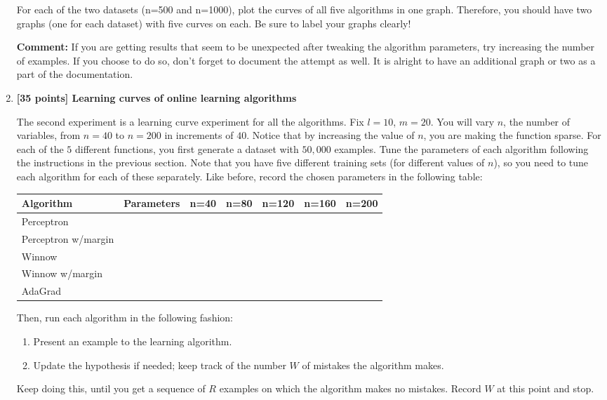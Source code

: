 \begin{enumerate}
For each of the two datasets (n=500 and n=1000), plot the curves of all
five algorithms in one graph. Therefore, you should have two
graphs (one for each dataset) with five curves on each. Be sure to
label your graphs clearly!

{\bf Comment: }If you are getting results that seem to be unexpected
after tweaking the algorithm parameters, try increasing the number of
examples.  If you choose to do so, don't forget to document the
attempt as well.  It is alright to have an additional graph or two as
a part of the documentation.


\item {\bf [35 points] Learning curves of online learning algorithms}

The second experiment is a learning curve experiment for all the
algorithms.  Fix $l=10$, $m=20$.  You will vary $n$, the number of
variables, from $n=40$ to $n=200$ in increments of $40$.  Notice that 
by increasing the value of $n$, you are making the function sparse.  
For each of the $5$ different functions, you first generate a dataset with
$50,000$ examples.  Tune the parameters of each algorithm following
the instructions in the previous section. Note that you have five
different training sets (for different values of $n$), so you need to tune each algorithm for each
of these separately. Like before, record the chosen parameters in the
following table:

  \begin{center}
    \begin{tabular}{|p{3.0cm}|p{2.2cm}|p{1cm}|p{1cm}|p{1cm}|p{1cm}|p{1cm}|}
      \hline
      Algorithm             &  Parameters & n=40 & n=80 & n=120 & n=160 & n=200\\\hline\hline
      Perceptron            &             &      &      &       &       &      \\\hline
      Perceptron w/margin   &             &      &      &       &       &      \\\hline
      Winnow                &             &      &      &       &       &      \\\hline
      Winnow w/margin       &             &      &      &       &       &      \\\hline
      AdaGrad               &             &      &      &       &       &      \\\hline
    \end{tabular}
  \end{center}
  
Then, run each algorithm in the following fashion:
\begin{enumerate}
\item Present an example to the learning algorithm.
\item Update the hypothesis if needed; keep track of the number $W$ of
mistakes the algorithm makes.
\end{enumerate}
Keep doing this, until you get a sequence of $R$ examples on which the
algorithm makes no mistakes. Record $W$ at this point and stop.


\end{enumerate}
